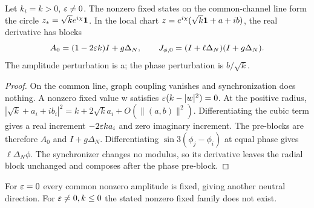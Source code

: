 \begin{theorem}\label{thm:homogeneous}
Let \(k_i=k>0\), \(\varepsilon\ne0\). The nonzero fixed states on the common-channel line form the circle \(z_*=\sqrt{k}e^{i\chi}\mathbf1\). In the local chart
\(z=e^{i\chi}(\sqrt{k}\mathbf1+a+ib)\), the real derivative has blocks
\begin{equation}
A_0=(1-2\varepsilon k)I+g\Delta_N,\qquad
J_{\phi,0}=(I+\ell\Delta_N)(I+g\Delta_N).\label{eq:homblocks}
\end{equation}
The amplitude perturbation is a; the phase perturbation is \(b/\sqrt{k}\).
\end{theorem}
\begin{proof}
On the common line, graph coupling vanishes and synchronization does nothing. A nonzero fixed value w satisfies \(\varepsilon(k-|w|^2)=0\). At the positive radius, \(|\sqrt{k}+a_i+ib_i|^2=k+2\sqrt{k}a_i+O(\|(a,b)\|^2)\). Differentiating the cubic term gives a real increment \(-2\varepsilon k a_i\) and zero imaginary increment. The pre-blocks are therefore \(A_0\) and \(I+g\Delta_N\). Differentiating \(\sin3(\phi_j-\phi_i)\) at equal phase gives \(\ell\Delta_N\phi\). The synchronizer changes no modulus, so its derivative leaves the radial block unchanged and composes after the phase pre-block.
\end{proof}
For \(\varepsilon=0\) every common nonzero amplitude is fixed, giving another neutral direction. For \(\varepsilon\ne0,k\le0\) the stated nonzero fixed family does not exist.

